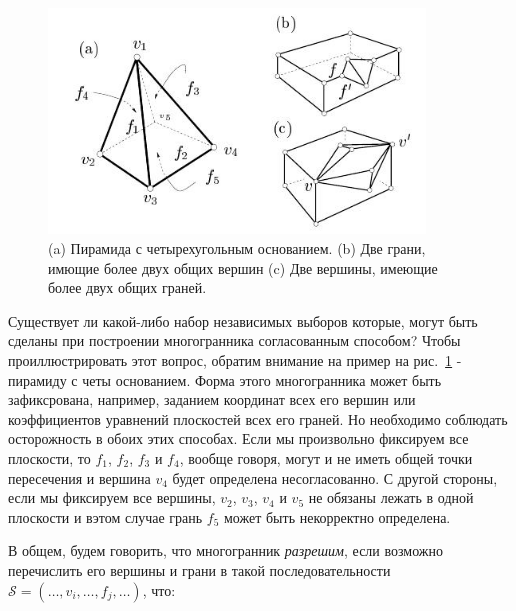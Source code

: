 \documentclass[a4paper,12pt, titlepage]{article}
\begin{document}
\begin{flushleft}
	\begin{figure}[thb]
	    \includegraphics[width=10cm]{img/ros-thomas-5.jpeg}
	    \caption{(a) Пирамида с четырехугольным основанием. 
	    (b) Две грани, имющие более двух общих вершин
	    (c) Две вершины, имеющие более двух общих граней.}
	    \label{figure-5}
	\end{figure}
\end{flushleft}


\begin{flushleft}
      Существует ли какой-либо набор независимых выборов которые, могут быть сделаны при 
построении многогранника согласованным способом? Чтобы проиллюстрировать этот вопрос, обратим
внимание на пример на рис.~\ref{figure-5} - пирамиду с четы основанием. Форма этого многогранника
может быть зафиксрована, например, заданием координат всех его вершин или коэффициентов
уравнений плоскостей всех его граней. Но необходимо соблюдать осторожность в обоих этих способах.
Если мы произвольно фиксируем все плоскости, то $f_{1}$, $f_{2}$, $f_{3}$ и $f_{4}$, вообще
говоря, могут и не иметь общей точки пересечения и вершина $v_{4}$ будет определена несогласованно.
С другой стороны, если мы фиксируем все вершины, $v_{2}$, $v_{3}$, $v_{4}$ и $v_{5}$ не 
обязаны лежать в одной плоскости и вэтом случае грань $f_{5}$ может быть некорректно определена.
\end{flushleft}

\begin{flushleft}
      В общем, будем говорить, что многогранник \textit{разрешим}, если возможно перечислить его
вершины и грани в такой последовательности 
$\mathcal{S} = (\ldots, v_{i}, \ldots, f_{j}, \ldots)$,
что:
\end{flushleft}
\end{document}
